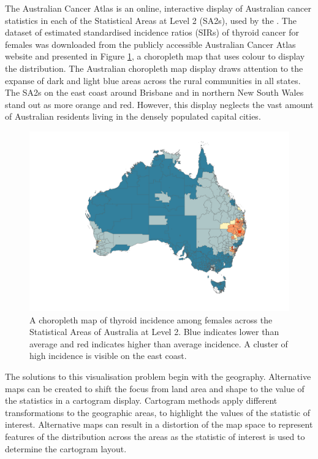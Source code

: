 The Australian Cancer Atlas is an online, interactive display of
Australian cancer statistics in each of the Statistical Areas at Level 2
(SA2s), used by the \citet{abs2011}. The dataset of estimated
standardised incidence ratios (SIRs) of thyroid cancer for females was
downloaded from the publicly accessible Australian Cancer Atlas website
and presented in Figure \ref{fig:choro}, a choropleth map that uses
colour to display the distribution. The Australian choropleth map
display draws attention to the expanse of dark and light blue areas
across the rural communities in all states. The SA2s on the east coast
around Brisbane and in northern New South Wales stand out as more orange
and red. However, this display neglects the vast amount of Australian
residents living in the densely populated capital cities.

\begin{Schunk}
\begin{figure}
\includegraphics[width=0.95\linewidth]{kobakian-cook_files/figure-latex/choro-1} \caption[A choropleth map of thyroid incidence among females across the Statistical Areas of Australia at Level 2]{A choropleth map of thyroid incidence among females across the Statistical Areas of Australia at Level 2. Blue indicates lower than average and red indicates higher than average incidence. A cluster of high incidence is visible on the east coast.}\label{fig:choro}
\end{figure}
\end{Schunk}

The solutions to this visualisation problem begin with the geography.
Alternative maps can be created to shift the focus from land area and
shape to the value of the statistics \citep{ACCAC} in a cartogram
display. Cartogram methods apply different transformations to the
geographic areas, to highlight the values of the statistic of interest.
Alternative maps can result in a distortion of the map space to
represent features of the distribution across the areas \citep{ACCAC} as
the statistic of interest is used to determine the cartogram layout.

